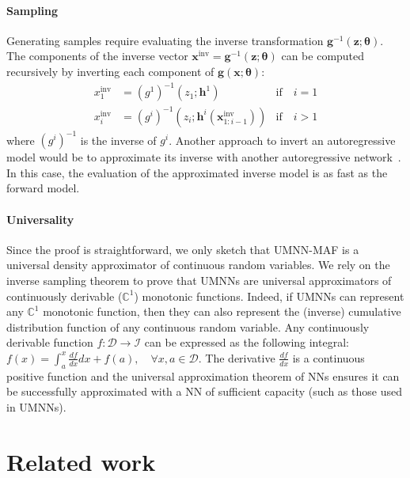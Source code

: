 \documentclass{article}
\newcommand{\mb}{\boldsymbol}
\newcommand{\brac}[1]{\left({#1}\right)}
\begin{document}
\paragraph{Sampling}
Generating samples require evaluating the inverse transformation $\mb{g}^{-1}(\mb{z}; \mb{\theta})$.
The components of the inverse vector $\mb{x}^{\text{inv}} = \mb{g}^{-1}(\mb{z}; \mb{\theta})$ can be computed recursively by inverting each component of $\mb{g}(\mb{x}; \mb{\theta})$:
\begin{align}
    x_1^{\text{inv}} &= \left(g^1\right)^{-1}\brac{z_1; \mb{h}^1}&\text{if} \quad i = 1\\
    x_{i}^{\text{inv}} &= \left(g^{i}\right)^{-1}\brac{z_{i}; \mb{h}^{i }\brac{\mb{x}_{1:i-1}^{\text{inv}}}}&\text{if} \quad i > 1
\end{align}
where $(g^i)^{-1}$ is the inverse of $g^i$. Another approach to invert an autoregressive model would be to approximate its inverse with another autoregressive network~\citep{parallel_wavenet}. In this case, the evaluation of the approximated inverse model is as fast as the forward model.

\paragraph{Universality}
Since the proof is straightforward, we only sketch that UMNN-MAF is a universal density approximator of continuous random variables. We rely on the inverse sampling theorem to prove that UMNNs are universal approximators of continuously derivable ($\mathbb{C}^1$) monotonic functions. Indeed, if UMNNs can represent any $\mathbb{C}^1$ monotonic function, then they can also represent the (inverse) cumulative distribution function of any continuous random variable. Any continuously derivable function $f: \mathcal{D}\rightarrow \mathcal{I}$ can be expressed as the following integral: $ f(x) = \int^x_a \frac{df}{dx} dx + f(a), \quad \forall x, a \in \mathcal{D}.$ The derivative $\frac{df}{dx}$ is a continuous positive function and the universal approximation theorem of NNs ensures it can be successfully approximated with a NN of sufficient capacity (such as those used in UMNNs).

\section{Related work}
\end{document}
